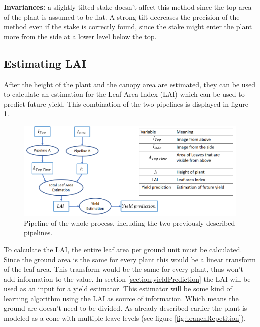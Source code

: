 \textbf{Invariances:} a slightly tilted stake doesn't affect this method since the top
area of the plant is assumed to be flat. A strong tilt decreases the precision of
the method even if the stake is correctly found, since the stake might enter the
plant more from the side at a lower level below the top.

\subsection{Estimating LAI}\label{subsec:estimating-lai}


\label{section:EstLAI}
After the height of the plant and the canopy area are estimated, they can be used to calculate an estimation for the Leaf Area Index (LAI) which can be used to predict future yield. This combination of the two pipelines is displayed in figure \ref{fig:wholePipeline}.
   \begin{figure}[H]
       \centering
       \includegraphics[scale=0.8]{wholePipeline.PNG}
       \caption{Pipeline of the whole process, including the two previously described pipelines.}
       \label{fig:wholePipeline}
   \end{figure}

To calculate the LAI, the entire leaf area per ground unit must be calculated.
Since the ground area is the same for every plant this would be a linear transform
of the leaf area. This transform would be the same for every plant, thus won't add
information to the value. In section \ref{section:yieldPrediction} the LAI will be
used as an input for a yield estimator. This estimator will be some kind of learning
algorithm using the LAI as source of information. Which means the ground are doesn't
need to be divided. As already described earlier the plant is modeled as a cone with
multiple leave levels (see figure \ref{fig:branchRepetition}).

